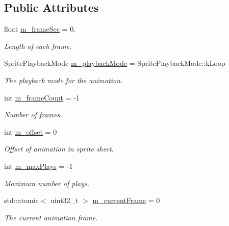 \subsection*{Public Attributes}
\begin{DoxyCompactItemize}
\item 
\mbox{\label{classrev_1_1_sprite_animation_a180d7901cab12dae5476527da7380c2b}} 
float \mbox{\hyperlink{classrev_1_1_sprite_animation_a180d7901cab12dae5476527da7380c2b}{m\+\_\+frame\+Sec}} = 0.
\begin{DoxyCompactList}\small\item\em Length of each frame. \end{DoxyCompactList}\item 
\mbox{\label{classrev_1_1_sprite_animation_a3ca0ff68e3235bf99b77a9d2a0f0d7a9}} 
Sprite\+Playback\+Mode \mbox{\hyperlink{classrev_1_1_sprite_animation_a3ca0ff68e3235bf99b77a9d2a0f0d7a9}{m\+\_\+playback\+Mode}} = Sprite\+Playback\+Mode\+::k\+Loop
\begin{DoxyCompactList}\small\item\em The playback mode for the animation. \end{DoxyCompactList}\item 
int \mbox{\hyperlink{classrev_1_1_sprite_animation_a1f437cc80086b0edcde346cf899f8b6a}{m\+\_\+frame\+Count}} = -\/1
\begin{DoxyCompactList}\small\item\em Number of frames. \end{DoxyCompactList}\item 
\mbox{\label{classrev_1_1_sprite_animation_a120c56de1da55c04c879263421bceee1}} 
int \mbox{\hyperlink{classrev_1_1_sprite_animation_a120c56de1da55c04c879263421bceee1}{m\+\_\+offset}} = 0
\begin{DoxyCompactList}\small\item\em Offset of animation in sprite sheet. \end{DoxyCompactList}\item 
\mbox{\label{classrev_1_1_sprite_animation_a898dfb9463563942dcfd49dd5af74314}} 
int \mbox{\hyperlink{classrev_1_1_sprite_animation_a898dfb9463563942dcfd49dd5af74314}{m\+\_\+max\+Plays}} = -\/1
\begin{DoxyCompactList}\small\item\em Maximum number of plays. \end{DoxyCompactList}\item 
std\+::atomic$<$ uint32\+\_\+t $>$ \mbox{\hyperlink{classrev_1_1_sprite_animation_acd68f6c75c699ce245b51f5cf53d4e97}{m\+\_\+current\+Frame}} = 0
\begin{DoxyCompactList}\small\item\em The current animation frame. \end{DoxyCompactList}\end{DoxyCompactItemize}


